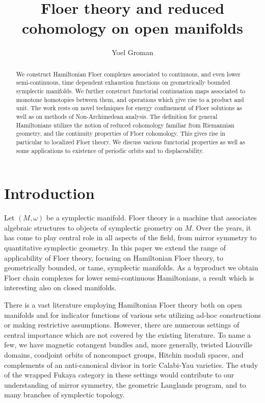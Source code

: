 \documentclass[11pt]{amsart}
\title{Floer theory and reduced cohomology on open manifolds}
\author{Yoel Groman}
\theoremstyle{definition}
\theoremstyle{remark}
\begin{document}
\maketitle
\begin{abstract}
We construct Hamiltonian Floer complexes associated to continuous, and even lower semi-continuous, time dependent exhaustion functions on geometrically bounded symplectic manifolds. We further construct functorial continuation maps associated to monotone homotopies between them, and operations which give rise to a product and unit. The work rests on novel techniques for energy confinement of Floer solutions as well as on methods of Non-Archimedean analysis. The definition for general Hamiltonians utilizes the notion of reduced cohomology familiar from Riemannian geometry, and the continuity properties of Floer cohomology. This gives rise in particular to localized Floer theory. We discuss various functorial properties as well as some applications to existence of periodic orbits and to displaceability.
\end{abstract}

\tableofcontents

\section{Introduction}
Let $(M,\omega)$ be a symplectic manifold. Floer theory is a machine that associates algebraic structures to objects of symplectic geometry on $M$. Over the years, it has come to play central role in all aspects of the field, from mirror symmetry to quantitative symplectic geometry. In this paper we extend the range of applicability of Floer theory, focusing on Hamiltonian Floer theory, to geometrically bounded, or tame, symplectic manifolds. As a byproduct we obtain Floer chain complexes for lower semi-continuous Hamiltonians, a result which is interesting also on closed manifolds.

There is a vast literature employing Hamiltonian Floer theory both on open manifolds and for indicator functions of various sets utilizing ad-hoc constructions or making restrictive assumptions. However, there are numerous settings of central importance which are not covered by the existing literature. To name a few, we have magnetic cotangent bundles and, more generally, twisted Liouville domains, coadjoint orbits of noncompact groups, Hitchin moduli spaces, and complements of an anti-canonical divisor in toric Calabi-Yau varieties. The study of the wrapped Fukaya category in these settings would contribute to our understanding of mirror symmetry, the geometric Langlands program, and to many branches of symplectic topology.
\end{document}

